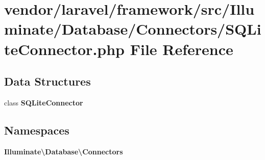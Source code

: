 \section{vendor/laravel/framework/src/\+Illuminate/\+Database/\+Connectors/\+S\+Q\+Lite\+Connector.php File Reference}
\label{_s_q_lite_connector_8php}
\subsection*{Data Structures}
\begin{DoxyCompactItemize}
\item 
class {\bf S\+Q\+Lite\+Connector}
\end{DoxyCompactItemize}
\subsection*{Namespaces}
\begin{DoxyCompactItemize}
\item 
 {\bf Illuminate\textbackslash{}\+Database\textbackslash{}\+Connectors}
\end{DoxyCompactItemize}
